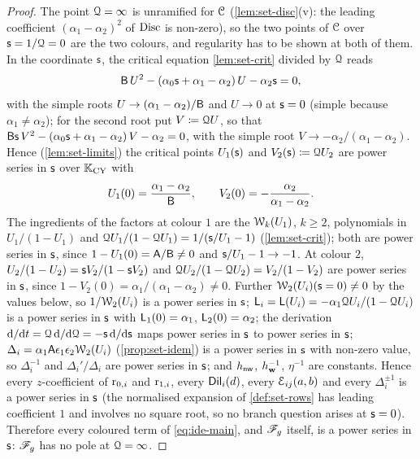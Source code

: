 \begin{proof}
The point $\mathcal{Q}=\infty$ is unramified for $\mathcal{C}$ (\cref{lem:set-disc}(v): the leading coefficient $(\alpha_1-\alpha_2)^2$ of $\operatorname{Disc}$ is non-zero), so the two points of $\mathcal{C}$ over $\mathsf{s}=1/\mathcal{Q}=0$ are the two colours, and regularity has to be shown at both of them. In the coordinate $\mathsf{s}$, the critical equation \cref{lem:set-crit} divided by $\mathcal{Q}$ reads
\[
\mathsf{B}\,U^2-(\alpha_0\mathsf{s}+\alpha_1-\alpha_2)\,U-\alpha_2\mathsf{s}=0,
\]
with the simple roots $U\to(\alpha_1-\alpha_2)/\mathsf{B}$ and $U\to 0$ at $\mathsf{s}=0$ (simple because $\alpha_1\neq\alpha_2$); for the second root put $V\coloneqq\mathcal{Q} U$, so that $\mathsf{B}\mathsf{s}\,V^2-(\alpha_0\mathsf{s}+\alpha_1-\alpha_2)\,V-\alpha_2=0$, with the simple root $V\to-\alpha_2/(\alpha_1-\alpha_2)$. Hence (\cref{lem:set-limits}) the critical points $U_1(\mathsf{s})$ and $V_2(\mathsf{s})\coloneqq\mathcal{Q} U_2$ are power series in $\mathsf{s}$ over $\mathbb{K}_{\mathrm{CY}}$ with
\[
U_1(0)=\frac{\alpha_1-\alpha_2}{\mathsf{B}},\qquad V_2(0)=-\frac{\alpha_2}{\alpha_1-\alpha_2}.
\]
The ingredients of the factors at colour $1$ are the $\mathcal{W}_k(U_1)$, $k\geq 2$, polynomials in $U_1/(1-U_1)$ and $\mathcal{Q} U_1/(1-\mathcal{Q} U_1)=1/(\mathsf{s}/U_1-1)$ (\cref{lem:set-crit}); both are power series in $\mathsf{s}$, since $1-U_1(0)=\mathsf{A}/\mathsf{B}\neq 0$ and $\mathsf{s}/U_1-1\to-1$. At colour $2$, $U_2/(1-U_2)=\mathsf{s} V_2/(1-\mathsf{s} V_2)$ and $\mathcal{Q} U_2/(1-\mathcal{Q} U_2)=V_2/(1-V_2)$ are power series in $\mathsf{s}$, since $1-V_2(0)=\alpha_1/(\alpha_1-\alpha_2)\neq 0$. Further $\mathcal{W}_2(U_i)(\mathsf{s}=0)\neq 0$ by the values below, so $1/\mathcal{W}_2(U_i)$ is a power series in $\mathsf{s}$; $\mathsf{L}_i=\mathsf{L}(U_i)=-\alpha_1\mathcal{Q} U_i/(1-\mathcal{Q} U_i)$ is a power series in $\mathsf{s}$ with $\mathsf{L}_1(0)=\alpha_1$, $\mathsf{L}_2(0)=\alpha_2$; the derivation $\mathrm{d}/\mathrm{d} t=\mathcal{Q}\,\mathrm{d}/\mathrm{d}\mathcal{Q}=-\mathsf{s}\,\mathrm{d}/\mathrm{d}\mathsf{s}$ maps power series in $\mathsf{s}$ to power series in $\mathsf{s}$; $\Delta_i=\alpha_1\mathsf{A}\epsilon_1\epsilon_2\mathcal{W}_2(U_i)$ (\cref{prop:set-idem}) is a power series in $\mathsf{s}$ with non-zero value, so $\Delta_i^{-1}$ and $\Delta_i'/\Delta_i$ are power series in $\mathsf{s}$; and $h_{\mathsf{nw}}$, $h_{\mathbf{w}}^{-1}$, $\eta^{-1}$ are constants. Hence every $z$-coefficient of $\mathrm{r}_{0,i}$ and $\mathrm{r}_{1,i}$, every $\mathsf{Dil}_i(d)$, every $\mathcal{E}_{ij}(a,b)$ and every $\Delta_i^{\pm 1}$ is a power series in $\mathsf{s}$ (the normalised expansion of \cref{def:set-rows} has leading coefficient $1$ and involves no square root, so no branch question arises at $\mathsf{s}=0$). Therefore every coloured term of \eqref{eq:ide-main}, and $\mathscr{F}_g$ itself, is a power series in $\mathsf{s}$: $\mathscr{F}_g$ has no pole at $\mathcal{Q}=\infty$.


\end{proof}
